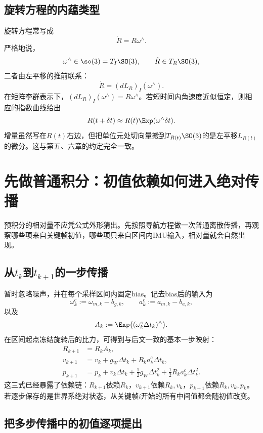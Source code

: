 \subsection{旋转方程的内蕴类型}

旋转方程常写成
\[
    \dot R=R\omega^\wedge.
\]
严格地说，
\[
    \omega^\wedge\in\so(3)=T_I\SO(3),
    \qquad
    \dot R\in T_R\SO(3),
\]
二者由左平移的推前联系：
\[
    \dot R=(dL_R)_I(\omega^\wedge).
\]
在矩阵李群表示下，$(dL_R)_I(\omega^\wedge)=R\omega^\wedge$。若短时间内角速度近似恒定，则相应的指数曲线给出
\[
    R(t+\delta t)
    \approx
    R(t)\Exp(\omega^\wedge\delta t).
\]
增量虽然写在$R(t)$右边，但把单位元处切向量搬到$T_{R(t)}\SO(3)$的是左平移$L_{R(t)}$的微分。这与第五、六章的约定完全一致。


\section{先做普通积分：初值依赖如何进入绝对传播}

预积分的相对量不应凭公式外形猜出。先按照导航方程做一次普通离散传播，再观察哪些项来自关键帧初值，哪些项只来自区间内IMU输入，相对量就会自然出现。

\subsection{从$t_k$到$t_{k+1}$的一步传播}

暂时忽略噪声，并在每个采样区间内固定bias。记去bias后的输入为
\[
    \omega_k^c:=\omega_{m,k}-b_{g,k},
    \qquad
    a_k^c:=a_{m,k}-b_{a,k},
\]
以及
\[
    A_k:=\Exp\bigl((\omega_k^c\Delta t_k)^\wedge\bigr).
\]
在区间起点冻结旋转后的比力，可得到与后文一致的基本一步映射：
\[
\boxed{
\begin{aligned}
    R_{k+1}
    &=R_kA_k,\\
    v_{k+1}
    &=v_k+g_W\Delta t_k+R_ka_k^c\Delta t_k,\\
    p_{k+1}
    &=p_k+v_k\Delta t_k
      +\frac12g_W\Delta t_k^2
      +\frac12R_ka_k^c\Delta t_k^2.
\end{aligned}
}
\]
这三式已经暴露了依赖链：$R_{k+1}$依赖$R_k$，$v_{k+1}$依赖$R_k,v_k$，$p_{k+1}$依赖$R_k,v_k,p_k$。若逐步保存的是世界系绝对状态，从关键帧$i$开始的所有中间值都会随初值改变。

\subsection{把多步传播中的初值逐项提出}

